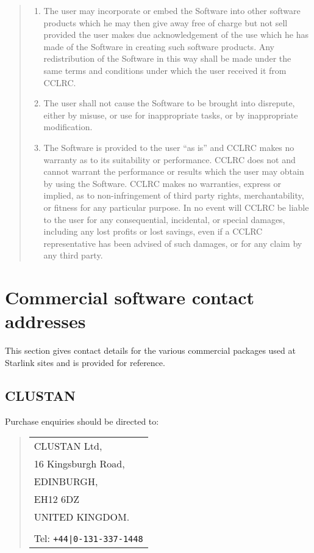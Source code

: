 \documentclass[twoside,11pt]{article}
\newcommand{\xlabel}[1]{}
\renewcommand{\_}{\texttt{\symbol{95}}}
\begin{document}
\begin{quote}
\begin{enumerate}
\item The user may incorporate or embed the Software into other software
products which he may then give away free of charge but not sell provided
the user makes due acknowledgement of the use which he has made of the
Software in creating such software products.   Any redistribution of the
Software in this way shall be made under the same terms and conditions
under which the user received it from CCLRC.

\item The user shall not cause the Software to be brought into disrepute,
either by misuse, or use for inappropriate tasks, or by inappropriate
modification.

\item The Software is provided to the user ``as is'' and CCLRC makes no
warranty as to its suitability or performance.   CCLRC does not and
cannot warrant the performance or results which the user may obtain by
using the Software.  CCLRC makes no warranties, express or implied, as
to non-infringement of third party rights, merchantability, or fitness
for any particular purpose.  In no event will CCLRC be liable to the
user for any consequential, incidental, or special damages, including
any lost profits or lost savings, even if a CCLRC representative has
been advised of such damages, or for any claim by any third party.

\end{enumerate}
\end{quote}

\newpage
\section{\xlabel{commercial_software_contact_addresses}Commercial software contact addresses}
\label{commercial_software_contact_addresses}

This section gives contact details for the various commercial packages used
at Starlink sites and is provided for reference.

\subsection{\xlabel{clustan}CLUSTAN}
\label{clustan}

Purchase enquiries should be directed to:

\begin{quote}
\begin{tabular}{l}
CLUSTAN Ltd,\\
16 Kingsburgh Road,\\
EDINBURGH,\\
EH12 6DZ\\
UNITED KINGDOM.\\
\\
Tel: \texttt{+44|0-131-337-1448}
\end{tabular}
\end{quote}
\end{document}
